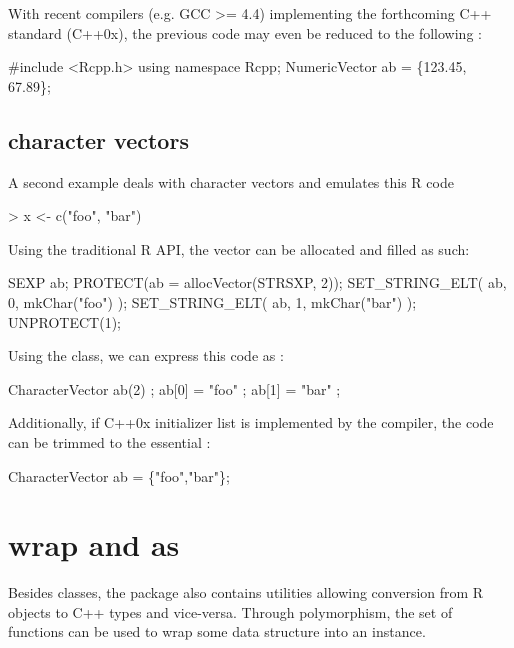 With recent compilers (e.g. GCC >= 4.4) implementing the forthcoming 
C++ standard (C++0x), the previous code may even be reduced 
to the following :

\begin{example}
#include <Rcpp.h>
using namespace Rcpp;
NumericVector ab = \{123.45, 67.89\};
\end{example}

\subsection{character vectors}

A second example deals with character vectors and emulates this R code

\begin{example}
> x <- c("foo", "bar")
\end{example}

Using the traditional R API, the vector can be allocated and filled as such:

\begin{example}
SEXP ab;
PROTECT(ab = allocVector(STRSXP, 2));
SET_STRING_ELT( ab, 0, mkChar("foo") );
SET_STRING_ELT( ab, 1, mkChar("bar") );
UNPROTECT(1);
\end{example}

Using the  class, we can express this code as : 

\begin{example}
CharacterVector ab(2) ;
ab[0] = "foo" ;
ab[1] = "bar" ;
\end{example}

Additionally, if C++0x initializer list is implemented by the compiler, the 
code can be trimmed to the essential :

\begin{example}
CharacterVector ab = \{"foo","bar"\};
\end{example}


\section{wrap and as}

Besides classes, the  package also contains utilities allowing
conversion from R objects to C++ types and vice-versa. Through 
polymorphism, the  set of functions can be used to wrap 
some data structure into an  instance. 

